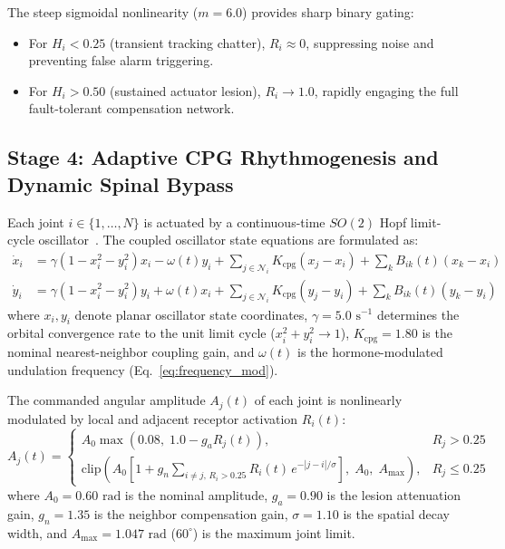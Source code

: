 \documentclass{iopjournal}
\begin{document}
The steep sigmoidal nonlinearity ($m = 6.0$) provides sharp binary gating:
\begin{itemize}
  \item For $H_i < 0.25$ (transient tracking chatter), $R_i \approx 0$, suppressing noise and preventing false alarm triggering.
  \item For $H_i > 0.50$ (sustained actuator lesion), $R_i \to 1.0$, rapidly engaging the full fault-tolerant compensation network.
\end{itemize}

\subsection{Stage 4: Adaptive CPG Rhythmogenesis and Dynamic Spinal Bypass}
Each joint $i \in \{1, \dots, N\}$ is actuated by a continuous-time $SO(2)$ Hopf limit-cycle oscillator~\cite{manoonpong2007,pasemann2002}. The coupled oscillator state equations are formulated as:
\begin{align}
\dot{x}_i &= \gamma (1 - x_i^2 - y_i^2) x_i - \omega(t) y_i + \sum_{j \in \mathcal{N}_i} K_{\text{cpg}} (x_j - x_i) + \sum_{k} B_{ik}(t) (x_k - x_i) \label{eq:cpg_x} \\
\dot{y}_i &= \gamma (1 - x_i^2 - y_i^2) y_i + \omega(t) x_i + \sum_{j \in \mathcal{N}_i} K_{\text{cpg}} (y_j - y_i) + \sum_{k} B_{ik}(t) (y_k - y_i) \label{eq:cpg_y}
\end{align}
where $x_i, y_i$ denote planar oscillator state coordinates, $\gamma = 5.0\text{ s}^{-1}$ determines the orbital convergence rate to the unit limit cycle ($x_i^2 + y_i^2 \to 1$), $K_{\text{cpg}} = 1.80$ is the nominal nearest-neighbor coupling gain, and $\omega(t)$ is the hormone-modulated undulation frequency (Eq.~\ref{eq:frequency_mod}).

The commanded angular amplitude $A_j(t)$ of each joint is nonlinearly modulated by local and adjacent receptor activation $R_i(t)$:
\begin{equation}
A_j(t) = \begin{cases}
A_0 \max\!\left(0.08,\; 1.0 - g_a R_j(t)\right), & R_j > 0.25 \\
\mathrm{clip}\!\left(A_0 \left[1 + g_n \sum_{i \neq j,\, R_i > 0.25} R_i(t)\, e^{-|j-i|/\sigma}\right],\; A_0,\; A_{\max}\right), & R_j \le 0.25
\end{cases}
\label{eq:amp_mod}
\end{equation}
where $A_0 = 0.60\text{ rad}$ is the nominal amplitude, $g_a = 0.90$ is the lesion attenuation gain, $g_n = 1.35$ is the neighbor compensation gain, $\sigma = 1.10$ is the spatial decay width, and $A_{\max} = 1.047\text{ rad}$ ($60^\circ$) is the maximum joint limit.
\end{document}
